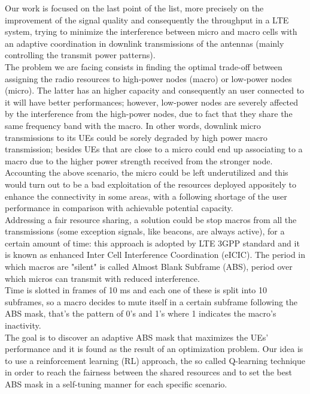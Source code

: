 \documentclass[conference,10pt]{IEEEtran}
\begin{document}
Our work is focused on the last point of the list, more precisely on the improvement of the signal quality and consequently the throughput in a LTE system, trying to minimize the interference between micro and macro cells with an adaptive coordination in downlink transmissions of the antennas (mainly controlling the transmit power patterns).\\
The problem we are facing consists in finding the optimal trade-off between assigning the radio resources to high-power nodes (macro) or low-power nodes (micro). The latter has an higher capacity and consequently an user connected to it will have better performances; however, low-power nodes are severely affected by the interference from the high-power nodes, due to fact that they share the same frequency band with the macro. In other words, downlink micro transmissions to its UEs could be sorely degraded by high power macro transmission; besides UEs that are close to a micro could end up associating to a macro due to the higher power strength received from the stronger node.\\
Accounting the above scenario, the micro could be left underutilized and this would turn out to be a bad exploitation of the resources deployed appositely to enhance the connectivity in some areas, with a following shortage of the user performance in comparison with achievable potential capacity.\\
Addressing a fair resource sharing, a solution could be stop macros from all the transmissions (some exception signals, like beacons, are always active), for a certain amount of time: this approach is adopted by LTE 3GPP standard and it is known as enhanced Inter Cell Interference Coordination (eICIC). The period in which macros are "silent" is called Almost Blank Subframe (ABS), period over which micros can transmit with reduced interference.\\
Time is slotted in frames of 10 ms and each one of these is split into 10 subframes, so a macro decides to mute itself in a certain subframe following the ABS mask, that's the pattern of 0's and 1's where 1 indicates the macro's inactivity.\\
The goal is to discover an adaptive ABS mask that maximizes the UEs' performance and it is found as the result of an optimization problem. Our idea is to use a reinforcement learning (RL) approach, the so called Q-learning technique in order to reach the fairness between the shared resources and to set the best ABS mask in a self-tuning manner for each specific scenario.\\
\end{document}
